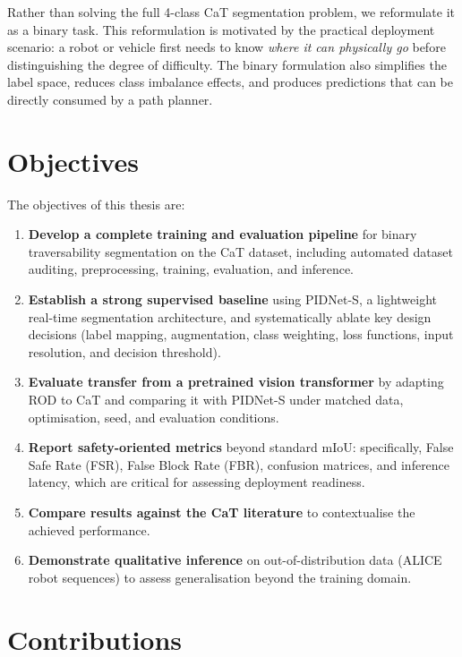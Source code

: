 \documentclass[12pt,a4paper]{report}
\begin{document}
Rather than solving the full 4-class CaT segmentation problem, we reformulate it as a binary task.
This reformulation is motivated by the practical deployment scenario: a robot or vehicle first needs to know \emph{where it can physically go} before distinguishing the degree of difficulty.
The binary formulation also simplifies the label space, reduces class imbalance effects, and produces predictions that can be directly consumed by a path planner.

\section{Objectives}

The objectives of this thesis are:
\begin{enumerate}[nosep]
  \item \textbf{Develop a complete training and evaluation pipeline} for binary traversability segmentation on the CaT dataset, including automated dataset auditing, preprocessing, training, evaluation, and inference.
  \item \textbf{Establish a strong supervised baseline} using PIDNet-S, a lightweight real-time segmentation architecture, and systematically ablate key design decisions (label mapping, augmentation, class weighting, loss functions, input resolution, and decision threshold).
  \item \textbf{Evaluate transfer from a pretrained vision transformer} by
  adapting ROD to CaT and comparing it with PIDNet-S under matched data,
  optimisation, seed, and evaluation conditions.
  \item \textbf{Report safety-oriented metrics} beyond standard mIoU: specifically, False Safe Rate (FSR), False Block Rate (FBR), confusion matrices, and inference latency, which are critical for assessing deployment readiness.
  \item \textbf{Compare results against the CaT literature} to contextualise the achieved performance.
  \item \textbf{Demonstrate qualitative inference} on out-of-distribution data (ALICE robot sequences) to assess generalisation beyond the training domain.
\end{enumerate}

\section{Contributions}
\end{document}
